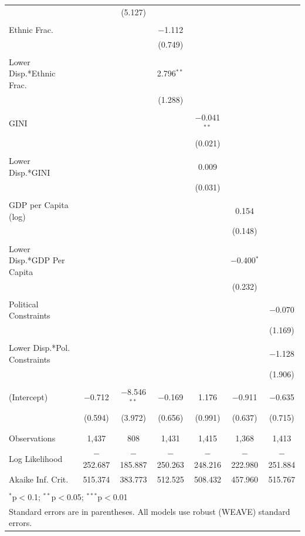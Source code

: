 \documentclass[a4paper]{article}\usepackage[]{graphicx}\usepackage[]{color}
\begin{document}
\begin{table}
\begin{center}
{\begin{tabular}{@{\extracolsep{5pt}}lcccccc}
  &  & (5.127) &  &  &  &  \\ 
  & & & & & & \\ 
 Ethnic Frac. &  &  & $-$1.112 &  &  &  \\ 
  &  &  & (0.749) &  &  &  \\ 
  & & & & & & \\ 
 Lower Disp.*Ethnic Frac. &  &  & 2.796$^{**}$ &  &  &  \\ 
  &  &  & (1.288) &  &  &  \\ 
  & & & & & & \\ 
 GINI &  &  &  & $-$0.041$^{**}$ &  &  \\ 
  &  &  &  & (0.021) &  &  \\ 
  & & & & & & \\ 
 Lower Disp.*GINI &  &  &  & 0.009 &  &  \\ 
  &  &  &  & (0.031) &  &  \\ 
  & & & & & & \\ 
 GDP per Capita (log) &  &  &  &  & 0.154 &  \\ 
  &  &  &  &  & (0.148) &  \\ 
  & & & & & & \\ 
 Lower Disp.*GDP Per Capita &  &  &  &  & $-$0.400$^{*}$ &  \\ 
  &  &  &  &  & (0.232) &  \\ 
  & & & & & & \\ 
 Political Constraints &  &  &  &  &  & $-$0.070 \\ 
  &  &  &  &  &  & (1.169) \\ 
  & & & & & & \\ 
 Lower Disp.*Pol. Constraints &  &  &  &  &  & $-$1.128 \\ 
  &  &  &  &  &  & (1.906) \\ 
  & & & & & & \\ 
 (Intercept) & $-$0.712 & $-$8.546$^{**}$ & $-$0.169 & 1.176 & $-$0.911 & $-$0.635 \\ 
  & (0.594) & (3.972) & (0.656) & (0.991) & (0.637) & (0.715) \\ 
  & & & & & & \\ 
\hline \\[-1.8ex] 
Observations & 1,437 & 808 & 1,431 & 1,415 & 1,368 & 1,413 \\ 
Log Likelihood & $-$252.687 & $-$185.887 & $-$250.263 & $-$248.216 & $-$222.980 & $-$251.884 \\ 
Akaike Inf. Crit. & 515.374 & 383.773 & 512.525 & 508.432 & 457.960 & 515.767 \\ 
\hline 
\hline \\[-1.8ex] 
\multicolumn{7}{l}{$^{*}$p$<$0.1; $^{**}$p$<$0.05; $^{***}$p$<$0.01} \\ 
\multicolumn{7}{l}{Standard errors are in parentheses. All models use robust (WEAVE) standard errors.} \\ 
\end{tabular} 

    }
    \end{center}
\end{table}
\end{document}
